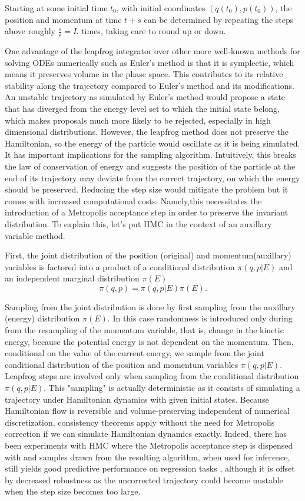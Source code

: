 \documentclass[12pt]{report}
\begin{document}
Starting at some initial time $t_0$, with initial coordinates $(q(t_0),p(t_0))$, the position and momentum at time $t+s$ can be determined by repeating the steps above roughly $\frac{s}{\epsilon} = L$ times, taking care to round up or down. 

One advantage of the leapfrog integrator over other more well-known methods for
solving ODEs numerically such as Euler's method is that it is symplectic, which
means it preserves volume in the phase space. This
contributes to its relative stability along the trajectory compared to Euler's
method and its modifications. An unstable trajectory as simulated by Euler's
method would propose a state that has diverged from the energy level set to
which the initial state belong, which makes proposals much more likely to be
rejected, especially in high dimensional distributions.  However,
the leapfrog method does not preserve the Hamiltonian, so the energy of the particle would
oscillate as it is being simulated. It has important implications for the
sampling algorithm. Intuitively, this breaks the law of conservation of energy
and suggests the position of the particle at the end of its trajectory may
deviate from the correct trajectory, on which the energy should be preserved.
Reducing the step size would mitigate the problem but it comes with increased
computational costs. Namely,this necessitates the introduction of a Metropolis
acceptance step in order to preserve the invariant distribution. To explain
this, let's put HMC in the context of an auxillary variable method. 

First, the joint distribution of the position (original) and momentum(auxillary)
variables is factored into a product of a conditional distribution $\pi(q,p|E)$ and an
independent marginal distribution $\pi(E)$
\[ \pi(q,p) = \pi(q,p|E)\pi(E) .\]

Sampling from the joint distribution is done by first sampling from the
auxillary (energy) distribution $\pi(E)$. In this case randomness is introduced only during from the
resampling of the momentum variable, that is, change in the kinetic energy,
because the potential energy is not dependent on the momentum. Then, conditional on the value of the
current energy, we sample from the joint
conditional distribution of the position and momentum variables $\pi(q,p|E)$. Leapfrog steps
are involved only when sampling from the conditional distribution $\pi(q,p|E)$.
This "sampling" is actually deterministic as it consists of simulating a
trajectory under Hamiltonian dynamics with given initial states. Because
Hamiltonian flow is reversible and volume-preserving independent of numerical
discretization, consistency theorems apply without the need for Metropolis
correction if we can simulate Hamiltonian dynamics exactly. Indeed, there has
been experiments with HMC where the Metropolis acceptance step is dispensed with
and samples drawn from the resulting algorithm, when used for inference, still yields good predictive
performance on regression tasks \cite{neal1993bayesian}, although it is offset
by
decreased robustness as the uncorrected trajectory could become unstable when
the step size becomes too large.
 
\end{document}
